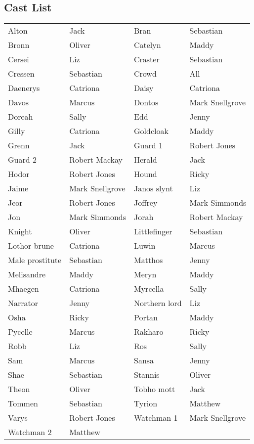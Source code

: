 \subsection*{Cast List}
\begin{tabular}{ll|ll}\\
Alton & Jack &  Bran & Sebastian\\
Bronn & Oliver &  Catelyn & Maddy\\
Cersei & Liz &  Craster & Sebastian\\
Cressen & Sebastian &  Crowd & All\\
Daenerys & Catriona &  Daisy & Catriona\\
Davos & Marcus &  Dontos & Mark Snellgrove\\
Doreah & Sally &  Edd & Jenny\\
Gilly & Catriona &  Goldcloak & Maddy\\
Grenn & Jack &  Guard 1 & Robert Jones\\
Guard 2 & Robert Mackay &  Herald & Jack\\
Hodor & Robert Jones &  Hound & Ricky\\
Jaime & Mark Snellgrove &  Janos slynt & Liz\\
Jeor & Robert Jones &  Joffrey & Mark Simmonds\\
Jon & Mark Simmonds &  Jorah & Robert Mackay\\
Knight & Oliver &  Littlefinger & Sebastian\\
Lothor brune & Catriona &  Luwin & Marcus\\
Male prostitute & Sebastian &  Matthos & Jenny\\
Melisandre & Maddy &  Meryn & Maddy\\
Mhaegen & Catriona &  Myrcella & Sally\\
Narrator & Jenny &  Northern lord & Liz\\
Osha & Ricky &  Portan & Maddy\\
Pycelle & Marcus &  Rakharo & Ricky\\
Robb & Liz &  Ros & Sally\\
Sam & Marcus &  Sansa & Jenny\\
Shae & Sebastian &  Stannis & Oliver\\
Theon & Oliver &  Tobho mott & Jack\\
Tommen & Sebastian &  Tyrion & Matthew\\
Varys & Robert Jones &  Watchman 1 & Mark Snellgrove\\
Watchman 2 & Matthew &  \end{tabular}
